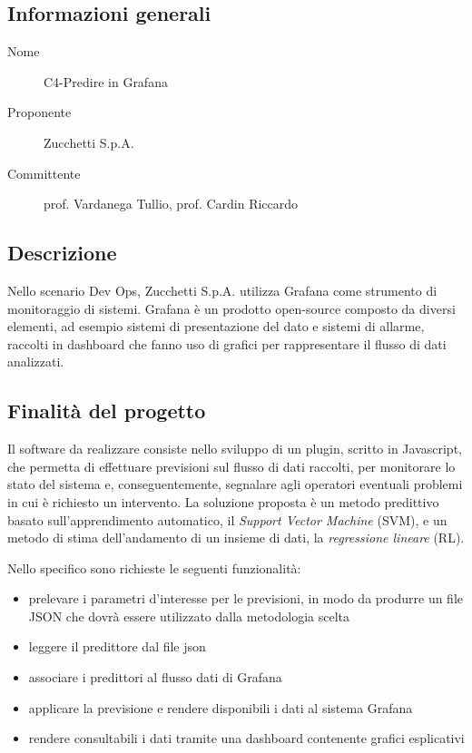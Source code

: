 \documentclass[../studio-di-fattibilita.tex]{subfiles}
\begin{document}
  \subsection{Informazioni generali}%
  \label{subsec:informazioni_generali}
  \begin{description}
    \item[Nome] C4-Predire in Grafana
    \item[Proponente] Zucchetti S.p.A.
    \item[Committente] prof. Vardanega Tullio, prof. Cardin Riccardo
  \end{description}


  \subsection{Descrizione}%
  \label{subsec:descrizione}
  Nello scenario Dev Ops, Zucchetti S.p.A. utilizza Grafana come strumento di monitoraggio di sistemi.
  Grafana è un prodotto open-source composto da diversi elementi, ad esempio sistemi di presentazione del dato e sistemi di allarme, raccolti in dashboard che fanno uso di grafici per rappresentare il flusso di dati analizzati.


  \subsection{Finalità del progetto}%
  \label{subsec:finalita_del_progetto}
  Il software da realizzare consiste nello sviluppo di un plugin, scritto in Javascript, che permetta di effettuare previsioni sul flusso di dati raccolti, per monitorare lo stato del sistema e, conseguentemente, segnalare agli operatori eventuali problemi in cui è richiesto un intervento. La soluzione proposta è un metodo predittivo basato sull'apprendimento automatico, il \textit{Support Vector Machine} (SVM), e un metodo di stima dell'andamento di un insieme di dati, la \textit{regressione lineare} (RL).

  Nello specifico sono richieste le seguenti funzionalità:
  \begin{itemize}
    \item prelevare i parametri d'interesse per le previsioni, in modo da produrre un file JSON che dovrà essere utilizzato dalla metodologia scelta
    \item leggere il predittore dal file json
    \item associare i predittori al flusso dati di Grafana
    \item applicare la previsione e rendere disponibili i dati al sistema Grafana
    \item rendere consultabili i dati tramite una dashboard contenente grafici esplicativi
  \end{itemize}
\end{document}
